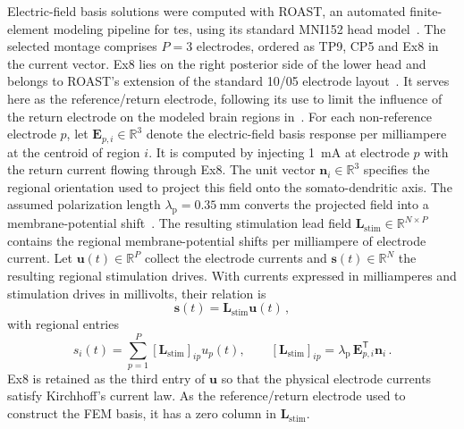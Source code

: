 Electric-field basis solutions were computed with ROAST, an automated finite-element modeling pipeline for \ac{tes}, using its standard MNI152 head model~\cite{Huang2019}. %
The selected montage comprises $P=3$ electrodes, ordered as TP9, CP5 and Ex8 in the current vector.
Ex8 lies on the right posterior side of the lower head and belongs to ROAST's extension of the standard 10/05 electrode layout~\cite{ROASTElectrodeLayout}. %
It serves here as the reference/return electrode, following its use to limit the influence of the return electrode on the modeled brain regions in~\cite{Yu2024}. %
For each non-reference electrode $p$, let $\mathbf{E}_{p,i}\in\mathbb{R}^{3}$ denote the electric-field basis response per milliampere at the centroid of region $i$.
It is computed by injecting \SI{1}{\milli\ampere} at electrode $p$ with the return current flowing through Ex8.
The unit vector $\mathbf{n}_i\in\mathbb{R}^{3}$ specifies the regional orientation used to project this field onto the somato-dendritic axis.
The assumed polarization length $\lambda_\mathrm{p}=\SI{0.35}{\milli\metre}$ converts the projected field into a membrane-potential shift~\cite{Radman2009}.
The resulting stimulation lead field $\mathbf{L}_\mathrm{stim}\in\mathbb{R}^{N\times P}$ contains the regional membrane-potential shifts per milliampere of electrode current.
Let $\mathbf{u}(t)\in\mathbb{R}^{P}$ collect the electrode currents and $\mathbf{s}(t)\in\mathbb{R}^{N}$ the resulting regional stimulation drives.
With currents expressed in milliamperes and stimulation drives in millivolts, their relation is
%
\begin{equation*}
    \mathbf{s}(t)=\mathbf{L}_\mathrm{stim}\mathbf{u}(t)\,,
\end{equation*}
%
with regional entries
%
\begin{equation*}
    s_i(t)=\sum_{p=1}^{P}[\mathbf{L}_\mathrm{stim}]_{ip}u_p(t),
    \qquad
    [\mathbf{L}_\mathrm{stim}]_{ip}
    =\lambda_\mathrm{p}\,\mathbf{E}_{p,i}^{\mathsf{T}}\mathbf{n}_i\,.
\end{equation*}
%
Ex8 is retained as the third entry of $\mathbf{u}$ so that the physical electrode currents satisfy Kirchhoff's current law.
As the reference/return electrode used to construct the FEM basis, it has a zero column in $\mathbf{L}_\mathrm{stim}$.

